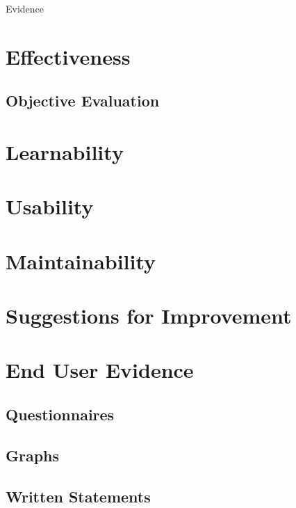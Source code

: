Evidence

\section{Effectiveness}

\subsection{Objective Evaluation}

\section{Learnability}

\section{Usability}

\section{Maintainability}

\section{Suggestions for Improvement}

\section{End User Evidence}

\subsection{Questionnaires}

\subsection{Graphs}

\subsection{Written Statements}
